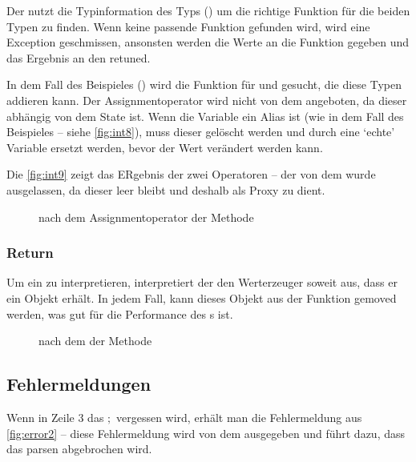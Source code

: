 {{      Der  nutzt die Typinformation des  Typs () um die richtige Funktion für die beiden Typen zu finden. Wenn keine passende Funktion gefunden wird, wird eine Exception geschmissen, ansonsten werden die Werte an die Funktion gegeben und das Ergebnis an den  retuned.

      In dem Fall des Beispieles () wird die Funktion für  und  gesucht, die diese Typen addieren kann. Der Assignmentoperator wird nicht von dem  angeboten, da dieser abhängig von dem  State ist. Wenn die Variable ein Alias ist (wie in dem Fall des Beispieles -- siehe \autoref{fig:int8}), muss dieser gelöscht werden und durch eine `echte' Variable ersetzt werden, bevor der Wert verändert werden kann.

      Die \autoref{fig:int9} zeigt das ERgebnis der zwei Operatoren -- der  von dem  wurde ausgelassen, da dieser leer bleibt und deshalb als Proxy zu  dient.
      \begin{figure}[H]
        \centering
        \caption{ nach dem Assignmentoperator der  Methode}
        \label{fig:int9}
      \end{figure}


    \subsubsection{Return}
    \label{sssec:Return}
      Um ein  zu interpretieren, interpretiert der  den Werterzeuger soweit aus, dass er ein  Objekt erhält. In jedem Fall, kann dieses Objekt aus der Funktion gemoved \autocite[S.268 ff.]{C++14-std} werden, was gut für die Performance des s ist.
      \begin{figure}[H]
        \centering
        \caption{ nach dem  der  Methode}
        \label{fig:int10}
      \end{figure}

  \subsection{Fehlermeldungen}
  \label{ssec:Fehlermeldungen}
    Wenn in Zeile 3 das \myRIn$;$ vergessen wird, erhält man die Fehlermeldung aus \autoref{fig:error2} -- diese Fehlermeldung wird von dem  ausgegeben und führt dazu, dass das parsen abgebrochen wird.

}}
